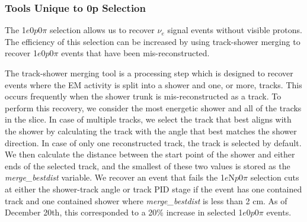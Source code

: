 \documentclass[a4paper]{article}
\newcommand{\npsel}{1$e$N$p$0$\pi$ }
\newcommand{\zpsel}{1$e$0$p$0$\pi$ }
\begin{document}
\subsubsection{Tools Unique to 0p Selection}


The \zpsel selection allows us to recover $\nu_e$ signal events without visible protons.  The efficiency of this selection can be increased by using track-shower merging to recover \zpsel events that have been mis-reconstructed.

The track-shower merging tool is a processing step 
which is designed to recover events where the EM activity is split into a shower and one, or more, tracks. This occurs frequently when the shower trunk is mis-reconstructed as a track. To perform this recovery, we consider the most energetic shower and all of the tracks in the slice.  In case of multiple tracks, we select the track that best aligns with the shower by calculating the track with the angle that best matches the shower direction. In case of only one reconstructed track, the track is selected by default. We then calculate the distance between the start point of the shower and either ends of the selected track, and the smallest of these two values is stored as the  \emph{merge\_bestdist} variable.  We recover an event that fails the \npsel selection cuts at either the shower-track angle or track PID stage if the event has one contained track and one contained shower where \emph{merge\_bestdist} is less than 2 cm. As of December 20th, this corresponded to a 20\% increase in selected \zpsel events.
\end{document}
